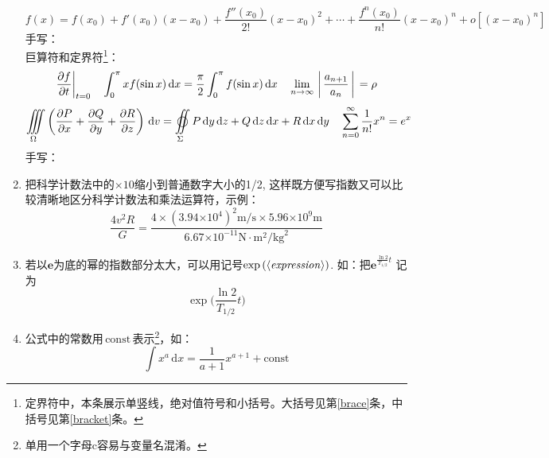 \documentclass[11pt, a4paper, titlepage]{article}
\newcommand{\diff}{\,\mathrm{d}} %
\begin{document}
\begin{enumerate}
\begin{displaymath}
    \end{displaymath}
    \begin{displaymath}
        f(x) = f(x_{0}) + f'(x_{0})(x - x_{0}) + \frac{f''(x_{0})}{2!}(x - x_{0})^{2} + \cdots + \frac{f^{n}(x_{0})}{n!}(x - x_{0})^{n} + o[(x - x_{0})^{n}]
    \end{displaymath}
    手写：\\[60pt]
    巨算符和定界符\footnote{定界符中，本条展示单竖线，绝对值符号和小括号。大括号见第\ref{brace}条，中括号见第\ref{bracket}条。}：
    \begin{displaymath}
        \left. \frac{\partial f}{\partial t} \right|_{t=0} \quad
        \int_0^{\pi} x f(\sin x) \diff x = \frac{\pi}{2} \int_0^{\pi} f(\sin x) \diff x \quad
        \lim_{n \to \infty}\bigg\arrowvert \frac{a_{n+1}}{a_{n}} \bigg\arrowvert = \rho
    \end{displaymath}
    \begin{displaymath}
        \iiint\limits_\Omega \left(\frac{\partial P}{\partial x} + \frac{\partial Q}{\partial y} + \frac{\partial R}{\partial z} \right) \diff v = \varoiint\limits_\Sigma P\diff y \diff z + Q\diff z \diff x + R\diff x \diff y \quad %
        \sum_{n=0}^\infty \frac{1}{n!} x^{n} = e^{x}
    \end{displaymath}
    手写：\\[60pt]

\item 把科学计数法中的$\scriptstyle\times10$缩小到普通数字大小的1/2, 这样既方便写指数又可以比较清晰地区分科学计数法和乘法运算符，示例：
    \begin{displaymath}
        \frac{4v^{2}R}{G} = \frac{4 \times (3.94{\scriptstyle\times10}^{4})^{2}\mathrm{m}/\mathrm{s} \times 5.96{\scriptstyle\times10}^{9}\mathrm{m}}{6.67{\scriptstyle\times10}^{-11}\mathrm{N}\cdot \mathrm{m}^{2}/\mathrm{kg}^{2}}
    \end{displaymath}

\item \label{brace}若以$\mathbf{e}$为底的幂的指数部分太大，可以用记号$\exp\left(\langle\text{\emph{expression}}\rangle\right)$. 如：把$\mathbf{e}^{\frac{\ln2}{T_{1/2}}t}$ 记为
    \begin{displaymath}
        \exp\biggl( \frac{\ln2}{T_{1/2}}t \biggr)
    \end{displaymath}

\item 公式中的常数用$\, \mathrm{const}\,$表示\footnote{单用一个字母c容易与变量名混淆。}，如：
    \begin{displaymath}
        \int x^{a}\diff x = \frac{1}{a+1} x^{a+1} + \mathrm{const}
    \end{displaymath}


\end{enumerate}
\end{document}
